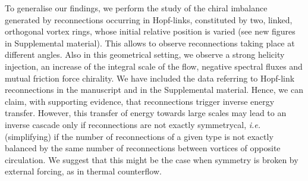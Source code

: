\documentclass[a4paper,10pt]{article}
\newcommand*{\CHANGE}[1]{{\color{magenta}#1}}
\begin{document}
\CHANGE{
To generalise our findings, we perform the study of the chiral imbalance generated by reconnections occurring in Hopf-links, constituted by two, linked, orthogonal vortex rings,
whose initial relative position is varied (see new figures in Supplemental material). This allows to observe reconnections taking place at different angles.
Also in this geometrical setting, we observe a strong helicity injection, an increase of the integral scale of the flow, negative spectral fluxes and mutual friction force 
chirality. We have included the data referring to Hopf-link reconnections in the manuscript and in the Supplemental material.
Hence, we can claim, with supporting evidence, that reconnections trigger inverse energy transfer. However, this transfer of energy towards large scales may lead
to an inverse cascade only if reconnections are not exactly symmetrycal, \textit{i.e.} (simplifying) if the number of reconnections of a given type is not exactly balanced by 
the same number of reconnections between vortices of opposite circulation. We suggest that this might be the case when symmetry is broken by external forcing, as in thermal counterflow.}  


\end{document}
